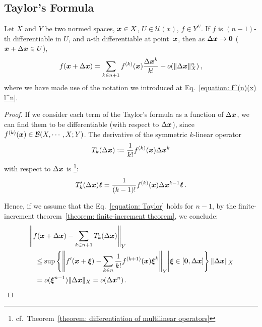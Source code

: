 \documentclass[openany]{book}
\begin{document}
\subsection{Taylor's Formula}
\begin{theorem}
	Let $X$ and $Y$ be two normed spaces, $\boldsymbol{x} \in X$, $U \in \mathscr U(x)$, $f \in Y^U$. 
	If $f$ is $(n-1)$-th differentiable in $U$, and $n$-th differentiable at point~$\boldsymbol{x}$, then as $\Delta \boldsymbol{x} \to \boldsymbol{0}$ ($\boldsymbol{x} + \Delta \boldsymbol{x} \in U$), 
	\begin{equation}\label{equation: Taylor}
		f(\boldsymbol{x} + \Delta \boldsymbol{x}) = \sum_{k \in n + 1} f^{(k)}(\boldsymbol{x}) \frac{\Delta \boldsymbol{x}^k}{k !} + o(\|\Delta \boldsymbol{x}\|_X^n)\,,
	\end{equation}
	where we have made use of the notation we introduced at Eq.~\eqref{equation: f^(n)(x) l^n}.
\end{theorem}
\begin{proof}
	If we consider each term of the Taylor's formula as a function of $\Delta \boldsymbol{x}$, we can find them to be differentiable (with respect to $\Delta \boldsymbol{x}$), since $f^{(k)}(\boldsymbol{x}) \in \mathcal B(X, \cdots, X; Y)$. The derivative of the symmetric $k$-linear operator
	\begin{equation*}
		T_k(\Delta \boldsymbol{x}) := \frac{1}{k!} f^{(k)}(\boldsymbol{x}) \Delta \boldsymbol{x}^k
	\end{equation*}
	with respect to $\Delta \boldsymbol{x}$ is%
		\footnote{cf.~Theorem~\ref{theorem: differentiation of multilinear operators}}:
	\begin{equation*}
		T_k'(\Delta \boldsymbol{x}) \boldsymbol{\ell} = \frac{1}{(k - 1)!} f^{(k)}(\boldsymbol{x}) \Delta \boldsymbol{x}^{k - 1} \boldsymbol{\ell}\,.
	\end{equation*}

	Hence, if we assume that the Eq.~\eqref{equation: Taylor} holds for $n - 1$, by the finite-increment theorem~\ref{theorem: finite-increment theorem}, we conclude:
	\begin{align*}
		&\left\|
			f(\boldsymbol{x} + \Delta \boldsymbol{x}) - \sum_{k \in n + 1} T_k(\Delta \boldsymbol{x})
		\right\|_Y 
		\\
		&\quad
			\leq \sup \left\{
				\left\|
					f'(\boldsymbol{x} + \boldsymbol{\xi}) - \sum_{k \in n} \frac{1}{k!} f^{(k + 1)}(\boldsymbol{x}) \boldsymbol{\xi}^k
				\right\|_Y
			\middle|
				\boldsymbol{\xi} \in [\boldsymbol{0}, \Delta \boldsymbol{x}]
			\right\} \|\Delta \boldsymbol{x}\|_X 
			\\
		&\quad
			= o(\boldsymbol{\xi}^{n-1}) \|\Delta \boldsymbol{x}\|_X = o(\Delta \boldsymbol{x}^n)\,.
	\end{align*}
\end{proof}
\end{document}
